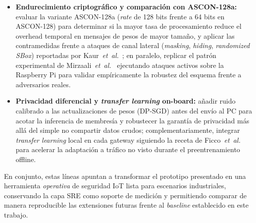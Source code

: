 \begin{itemize}
    \item \textbf{Endurecimiento criptográfico y comparación con ASCON-128a:} evaluar la variante ASCON-128a (\emph{rate} de 128 bits frente a 64 bits en ASCON-128) para determinar si la mayor tasa de procesamiento reduce el overhead temporal en mensajes de pesos de mayor tamaño, y aplicar las contramedidas frente a ataques de canal lateral (\emph{masking}, \emph{hiding}, \emph{randomized SBox}) reportadas por Kaur~\textit{et~al.}~\cite{Kaur2025_ASCON_Survey}; en paralelo, replicar el patrón experimental de Mirzaali~\textit{et~al.}~\cite{Mirzaali2025_LWC_Permutations} ejecutando ataques activos sobre la Raspberry Pi para validar empíricamente la robustez del esquema frente a adversarios reales.

    \item \textbf{Privacidad diferencial y \emph{transfer learning} on-board:} añadir ruido calibrado a las actualizaciones de pesos (DP-SGD) antes del envío al PC para acotar la inferencia de membresía y robustecer la garantía de privacidad más allá del simple no compartir datos crudos; complementariamente, integrar \emph{transfer learning} local en cada gateway siguiendo la receta de Ficco~\textit{et~al.}~\cite{Ficco2024_FL_TinyML_Onboard} para acelerar la adaptación a tráfico no visto durante el preentrenamiento offline.
\end{itemize}

En conjunto, estas líneas apuntan a transformar el prototipo presentado en una herramienta \emph{operativa} de seguridad IoT lista para escenarios industriales, conservando la capa SRE como soporte de medición y permitiendo comparar de manera reproducible las extensiones futuras frente al \emph{baseline} establecido en este trabajo.
